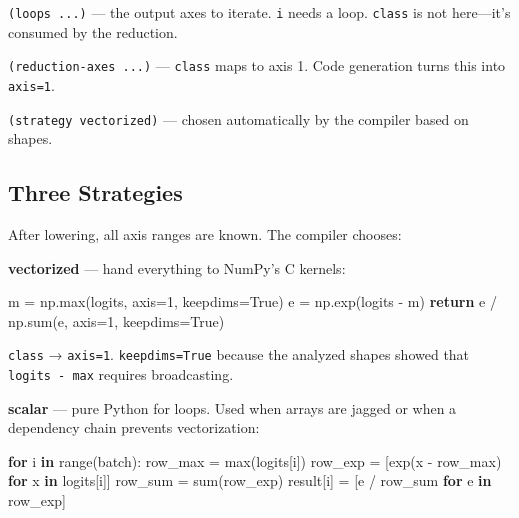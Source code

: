 \documentclass[11pt,titlepage]{article}
\newenvironment{Shaded}{}{}
\newcommand{\BuiltInTok}[1]{#1}
\newcommand{\ControlFlowTok}[1]{\textcolor[rgb]{0.00,0.44,0.13}{\textbf{#1}}}
\newcommand{\DecValTok}[1]{\textcolor[rgb]{0.25,0.63,0.44}{#1}}
\newcommand{\KeywordTok}[1]{\textcolor[rgb]{0.00,0.44,0.13}{\textbf{#1}}}
\newcommand{\NormalTok}[1]{#1}
\newcommand{\OperatorTok}[1]{\textcolor[rgb]{0.40,0.40,0.40}{#1}}
\newcommand{\VariableTok}[1]{\textcolor[rgb]{0.10,0.09,0.49}{#1}}
\begin{document}
\texttt{(loops\ ...)} --- the output axes to iterate. \texttt{i} needs a
loop. \texttt{class} is not here---it's consumed by the reduction.

\texttt{(reduction-axes\ ...)} --- \texttt{class} maps to axis 1. Code
generation turns this into \texttt{axis=1}.

\texttt{(strategy\ vectorized)} --- chosen automatically by the compiler
based on shapes.

\vspace{2em}

\hypertarget{three-strategies}{%
\subsection{Three Strategies}\label{three-strategies}}

After lowering, all axis ranges are known. The compiler chooses:

\textbf{vectorized} --- hand everything to NumPy's C kernels:

\begin{Shaded}
\begin{Highlighting}[]
\NormalTok{m }\OperatorTok{=}\NormalTok{ np.}\BuiltInTok{max}\NormalTok{(logits, axis}\OperatorTok{=}\DecValTok{1}\NormalTok{, keepdims}\OperatorTok{=}\VariableTok{True}\NormalTok{)}
\NormalTok{e }\OperatorTok{=}\NormalTok{ np.exp(logits }\OperatorTok{-}\NormalTok{ m)}
\ControlFlowTok{return}\NormalTok{ e }\OperatorTok{/}\NormalTok{ np.}\BuiltInTok{sum}\NormalTok{(e, axis}\OperatorTok{=}\DecValTok{1}\NormalTok{, keepdims}\OperatorTok{=}\VariableTok{True}\NormalTok{)}
\end{Highlighting}
\end{Shaded}

\texttt{class} → \texttt{axis=1}. \texttt{keepdims=True} because the
analyzed shapes showed that \texttt{logits\ -\ max} requires
broadcasting.

\textbf{scalar} --- pure Python for loops. Used when arrays are jagged
or when a dependency chain prevents vectorization:

\begin{Shaded}
\begin{Highlighting}[]
\ControlFlowTok{for}\NormalTok{ i }\KeywordTok{in} \BuiltInTok{range}\NormalTok{(batch):}
\NormalTok{    row_max }\OperatorTok{=} \BuiltInTok{max}\NormalTok{(logits[i])}
\NormalTok{    row_exp }\OperatorTok{=}\NormalTok{ [exp(x }\OperatorTok{-}\NormalTok{ row_max) }\ControlFlowTok{for}\NormalTok{ x }\KeywordTok{in}\NormalTok{ logits[i]]}
\NormalTok{    row_sum }\OperatorTok{=} \BuiltInTok{sum}\NormalTok{(row_exp)}
\NormalTok{    result[i] }\OperatorTok{=}\NormalTok{ [e }\OperatorTok{/}\NormalTok{ row_sum }\ControlFlowTok{for}\NormalTok{ e }\KeywordTok{in}\NormalTok{ row_exp]}
\end{Highlighting}
\end{Shaded}
\end{document}
